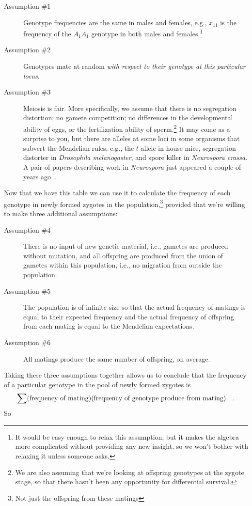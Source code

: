 \documentclass[12pt]{article}
\begin{document}
\begin{description}

\item[Assumption \#1] Genotype frequencies are the same in males and
  females, e.g., $x_{11}$ is the frequency of the $A_1A_1$ genotype in
  both males and females.\footnote{It would be easy enough to relax
    this assumption, but it makes the algebra more complicated without
    providing any new insight, so we won't bother with relaxing it
    unless someone asks.}

\item[Assumption \#2] Genotypes mate at random {\it with respect to
  their genotype at this particular locus}.

\item[Assumption \#3] Meiosis is fair. More specifically, we assume
  that there is no segregation distortion; no gamete competition; no
  differences in the developmental ability of eggs, or the
  fertilization ability of sperm.\footnote{We are also assuming that
    we're looking at offspring genotypes at the zygote stage, so that
    there hasn't been any opportunity for differential survival.} It
  may come as a surprise to you, but there are alleles at some loci in
  some organisms that subvert the Mendelian rules, e.g., the $t$
  allele in house mice, segregation distorter in {\it Drosophila
    melanogaster}, and spore killer in {\it Neurospora crassa\/}. A
  pair of papers describing work in {\it Neurospora\/} just appeared a
  couple of years ago~\cite{Hammond-etal-2012,Saupe-2012}.

\end{description}
Now that we have this table we can use it to calculate the frequency
of each genotype in newly formed zygotes in the
population,\footnote{Not just the offspring from these matings}
provided that we're willing to make three additional assumptions:

\begin{description}

\item[Assumption \#4] There is no input of new genetic material, i.e.,
gametes are produced without mutation, and all offspring are produced
from the union of gametes within this population, i.e., no migration
from outside the population.

\item[Assumption \#5] The population is of infinite size so that the
actual frequency of matings is equal to their expected frequency and
the actual frequency of offspring from each mating is equal to the
Mendelian expectations.

\item[Assumption \#6] All matings produce the same number of
offspring, on average.

\end{description}
Taking these three assumptions together allows us to conclude that the
frequency of a particular genotype in the pool of newly formed zygotes
is
\[
\sum(\hbox{frequency of mating})(\hbox{frequency of genotype produce
  from mating}) \quad .
\]
So
\end{document}
